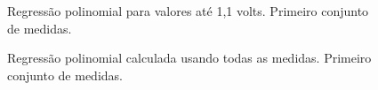 \documentclass[brazilian,12pt,a4paper,final]{article}
\begin{document}
\begin{figure}[htbp!]
  \caption{Regressão polinomial para valores até 1,1 volts. Primeiro conjunto de medidas.}
  \label{figiniciopeq}
  \centering
\end{figure}

\begin{figure}[htbp!]
  \caption{Regressão polinomial calculada usando todas as medidas. Primeiro conjunto de medidas.}
  \label{figiniciogr}
  \centering
\end{figure}
\end{document}
